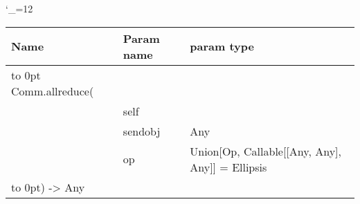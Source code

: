 \begingroup \catcode`\_=12 \tt
\begin{tabular}{lll}
\toprule
\textrm{Name}&\textrm{Param name}&\textrm{param type}\\
\midrule
\hbox to 0pt {Comm.allreduce(\hss}\\
& self\\
& sendobj & Any\\
& op & Union[Op, Callable[[Any, Any], Any]] = Ellipsis\\
\hbox to 0pt{) -> Any\hss}\\
\bottomrule
\end{tabular}
\endgroup
